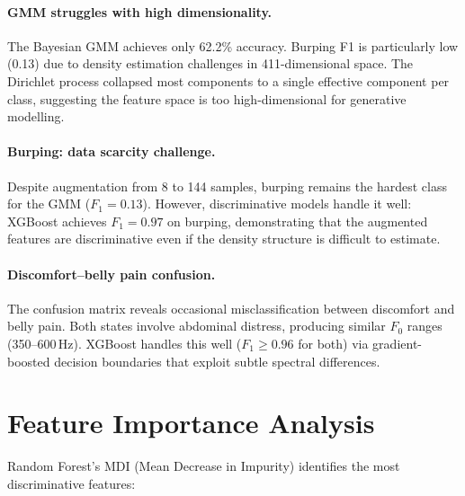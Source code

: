 \documentclass[11pt,a4paper]{article}
\begin{document}
\paragraph{GMM struggles with high dimensionality.}
The Bayesian GMM achieves only 62.2\% accuracy. Burping F1 is
particularly low (0.13) due to density estimation challenges in
411-dimensional space. The Dirichlet process collapsed most
components to a single effective component per class, suggesting
the feature space is too high-dimensional for generative modelling.

\paragraph{Burping: data scarcity challenge.}
Despite augmentation from 8 to 144 samples, burping remains the
hardest class for the GMM ($F_1=0.13$). However, discriminative
models handle it well: XGBoost achieves $F_1=0.97$ on burping,
demonstrating that the augmented features are discriminative even
if the density structure is difficult to estimate.

\paragraph{Discomfort--belly pain confusion.}
The confusion matrix reveals occasional misclassification between
discomfort and belly pain. Both states involve abdominal
distress, producing similar $F_0$ ranges (350--600\,Hz). XGBoost
handles this well ($F_1 \geq 0.96$ for both) via gradient-boosted
decision boundaries that exploit subtle spectral differences.

\section{Feature Importance Analysis}
\label{sec:feature_importance}

Random Forest's MDI (Mean Decrease in Impurity) identifies the most
discriminative features:
\end{document}
